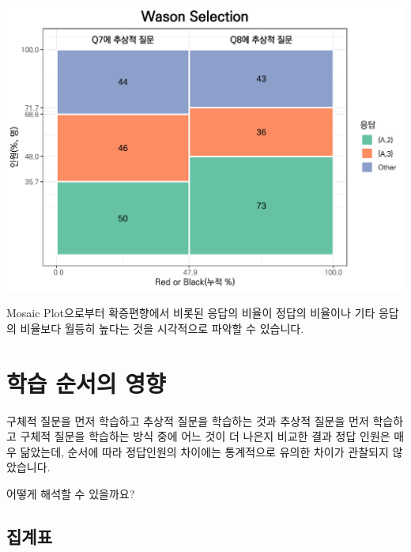 \documentclass[
]{book}
\begin{document}
\includegraphics{Quiz_report_2025_files/figure-latex/unnamed-chunk-201-1.pdf}

Mosaic Plot으로부터 확증편향에서 비롯된 응답의 비율이 정답의 비율이나 기타 응답의 비율보다 월등히 높다는 것을 시각적으로 파악할 수 있습니다.

\section{학습 순서의 영향}\label{uxd559uxc2b5-uxc21cuxc11cuxc758-uxc601uxd5a5}

구체적 질문을 먼저 학습하고 추상적 질문을 학습하는 것과 추상적 질문을 먼저 학습하고 구체적 질문을 학습하는 방식 중에 어느 것이 더 나은지 비교한 결과 정답 인원은 매우 닮았는데, 순서에 따라 정답인원의 차이에는 통계적으로 유의한 차이가 관찰되지 않았습니다.

어떻게 해석할 수 있을까요?

\subsection{집계표}\label{uxc9d1uxacc4uxd45c-2}
\end{document}
